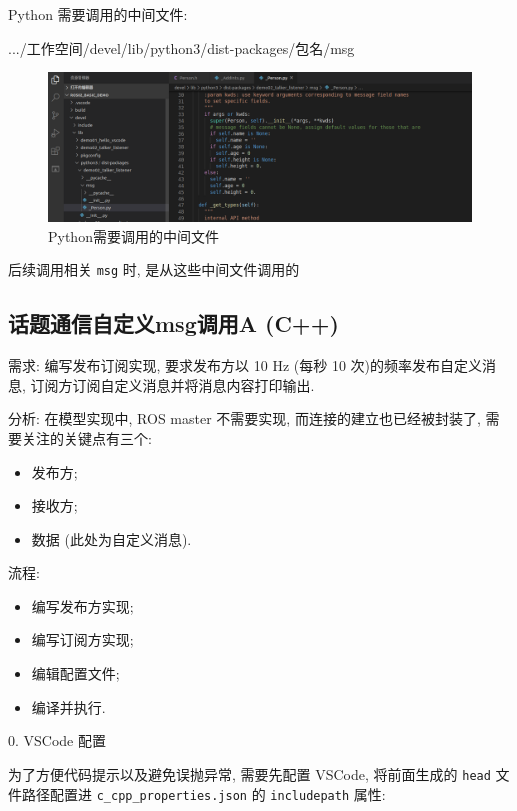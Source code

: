 \documentclass[openany, fontset=windowsold]{ctexbook}
\theoremstyle{kaiti}
\theoremstyle{normal}
\begin{document}
Python 需要调用的中间文件:

\begin{bash}
  .../工作空间/devel/lib/python3/dist-packages/包名/msg
\end{bash}

\begin{figure}[!ht]
  \centering
  \includegraphics[width=.9\textwidth]{customized_msg_vscode_python.png}
  \caption{Python需要调用的中间文件}
  \label{fig:cusomized_msg_vscode_python}
\end{figure}

后续调用相关 \verb|msg| 时, 是从这些中间文件调用的

\subsection{话题通信自定义msg调用A (C++)}

需求: 编写发布订阅实现, 要求发布方以 10 Hz (每秒 10 次)的频率发布自定义消息, 订阅方订阅自定义消息并将消息内容打印输出.

分析: 在模型实现中, ROS master 不需要实现, 而连接的建立也已经被封装了, 需要关注的关键点有三个:

\begin{itemize}
  \item 发布方;
  \item 接收方;
  \item 数据 (此处为自定义消息).
\end{itemize}

流程:

\begin{itemize}
  \item 编写发布方实现; 
  \item 编写订阅方实现; 
  \item 编辑配置文件; 
  \item 编译并执行.
\end{itemize}

0. VSCode 配置

为了方便代码提示以及避免误抛异常, 需要先配置 VSCode, 将前面生成的 \verb|head| 文件路径配置进 \verb|c_cpp_properties.json| 的 \verb|includepath| 属性:
\end{document}
